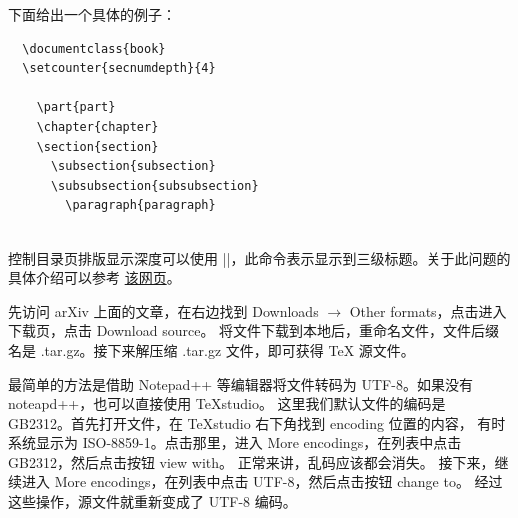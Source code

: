 下面给出一个具体的例子：

\begin{verbatim}
  \documentclass{book}
  \setcounter{secnumdepth}{4}
  
    \part{part}
    \chapter{chapter}
    \section{section}
      \subsection{subsection}
      \subsubsection{subsubsection}
        \paragraph{paragraph}
  
\end{verbatim}

控制目录页排版显示深度可以使用 |\setcounter{tocdepth}{2}|，此命令表示显示到三级标题。关于此问题的具体介绍可以参考
\href{https://blog.csdn.net/RobertChenGuangzhi/article/details/50480856}{该网页}。


先访问 arXiv 上面的文章，在右边找到 Downloads $\rightarrow$ Other formats，点击进入下载页，点击 Download source。
将文件下载到本地后，重命名文件，文件后缀名是 .tar.gz。接下来解压缩 .tar.gz 文件，即可获得 \TeX{} 源文件。



最简单的方法是借助 Notepad++ 等编辑器将文件转码为 UTF-8。如果没有 noteapd++，也可以直接使用 TeXstudio。
这里我们默认文件的编码是 GB2312。首先打开文件，在 TeXstudio 右下角找到 encoding 位置的内容，
有时系统显示为 ISO-8859-1。点击那里，进入 More encodings，在列表中点击 GB2312，然后点击按钮 view with。
正常来讲，乱码应该都会消失。 接下来，继续进入 More encodings，在列表中点击 UTF-8，然后点击按钮 change to。
经过这些操作，源文件就重新变成了 UTF-8 编码。


